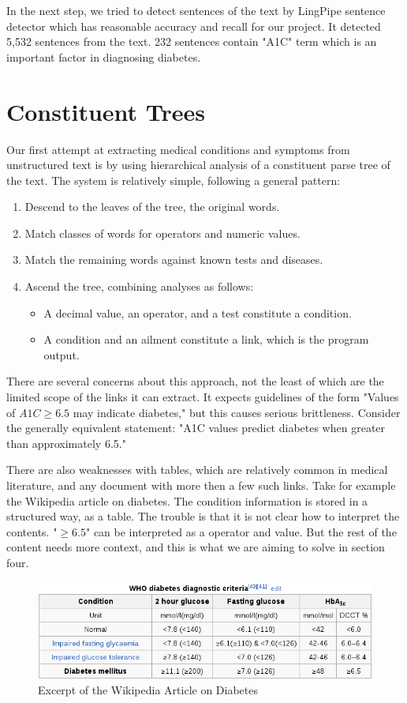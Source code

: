 \documentclass[12pt,letterpaper]{article}
\begin{document}
In the next step, we tried to detect sentences of the text by LingPipe sentence detector which has reasonable accuracy and recall for our project. It detected 5,532 sentences from the text. 232 sentences contain "A1C" term which is an important factor in diagnosing diabetes.
   
\section{Constituent Trees}
Our first attempt at extracting medical conditions and symptoms from unstructured text is by using hierarchical analysis of a constituent parse tree of the text. The system is relatively simple, following a general pattern:

\begin{enumerate}
\item Descend to the leaves of the tree, the original words.
\item Match classes of words for operators and numeric values.
\item Match the remaining words against known tests and diseases.
\item Ascend the tree, combining analyses as follows:
\begin{itemize}
	\item A decimal value, an operator, and a test constitute a condition.
	\item A condition and an ailment constitute a link, which is the program output.
\end{itemize}
\end{enumerate}

There are several concerns about this approach, not the least of which are the limited scope of the links it can extract. It expects guidelines of the form
"Values of $A1C \geq 6.5$ may indicate diabetes," but this causes serious brittleness. Consider the generally equivalent statement: "A1C values predict diabetes when greater than approximately 6.5."

There are also weaknesses with tables, which are relatively common in medical literature, and any document with more then a few such links. Take for example the Wikipedia article on diabetes. The condition information is stored in a structured way, as a table. The trouble is that it is not clear how to interpret the contents. "$\geq 6.5$" can be interpreted as a operator and value. But the rest of the content needs more context, and this is what we are aiming to solve in section four.
\begin{figure}
\includegraphics[width=\textwidth]{WikipediaA1CTable}
\caption{Excerpt of the Wikipedia Article on Diabetes}
\end{figure}
\end{document}
